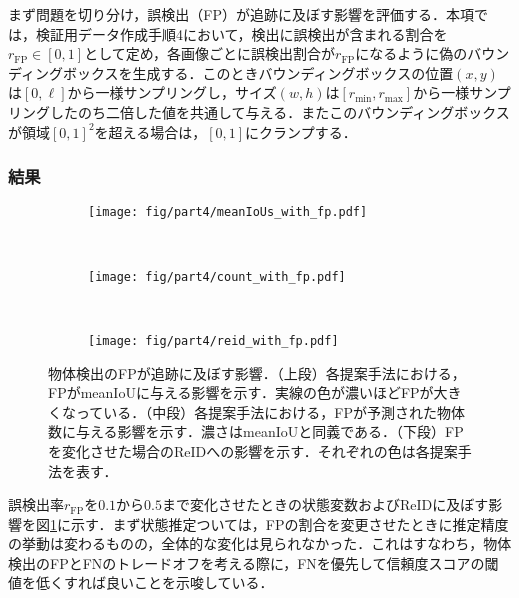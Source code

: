    まず問題を切り分け，誤検出（FP）が追跡に及ぼす影響を評価する．本項では，検証用データ作成手順4において，検出に誤検出が含まれる割合を$r_{\text{FP}} \in [0, 1]$として定め，各画像ごとに誤検出割合が$r_{\text{FP}}$になるように偽のバウンディングボックスを生成する．このときバウンディングボックスの位置$(x,y)$は$[0, \ell]$から一様サンプリングし，サイズ$(w, h)$は$[r_{\text{min}}, r_{\text{max}}]$から一様サンプリングしたのち二倍した値を共通して与える．またこのバウンディングボックスが領域$[0, 1]^2$を超える場合は，$[0, 1]$にクランプする．

        \subsubsection{結果}

        \begin{figure}[t]
            \begin{subfigure}[t]{\linewidth}
                \centering
                \texttt{[image: fig/part4/meanIoUs\_with\_fp.pdf]}
            \end{subfigure}
            \\
            \begin{subfigure}[t]{\linewidth}
                \centering
                \texttt{[image: fig/part4/count\_with\_fp.pdf]}
            \end{subfigure}
            \\
            \begin{subfigure}[t]{\linewidth}
                \centering
                \texttt{[image: fig/part4/reid\_with\_fp.pdf]}
            \end{subfigure}
            \caption[物体検出のFPが追跡に及ぼす影響]{物体検出のFPが追跡に及ぼす影響．（上段）各提案手法における，FPがmeanIoUに与える影響を示す．実線の色が濃いほどFPが大きくなっている．（中段）各提案手法における，FPが予測された物体数に与える影響を示す．濃さはmeanIoUと同義である．（下段）FPを変化させた場合のReIDへの影響を示す．それぞれの色は各提案手法を表す．}
            \label{fig:FP_effect}
        \end{figure}

        誤検出率$r_{\text{FP}}$を$0.1$から$0.5$まで変化させたときの状態変数およびReIDに及ぼす影響を図\ref{fig:FP_effect}に示す．まず状態推定ついては，FPの割合を変更させたときに推定精度の挙動は変わるものの，全体的な変化は見られなかった．これはすなわち，物体検出のFPとFNのトレードオフを考える際に，FNを優先して信頼度スコアの閾値を低くすれば良いことを示唆している．

